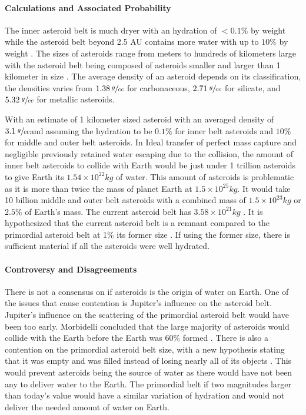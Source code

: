 \paragraph{Calculations and Associated Probability}
The inner asteroid belt is much dryer with an hydration of \(<0.1\%\) by weight while the  asteroid belt beyond 2.5 AU contains more water with up to \(10\%\) by weight \cite{morbidelli2000source}. The sizes of asteroids range from meters to hundreds of kilometers large with the asteroid belt being composed of asteroids smaller and larger than 1 kilometer in size \cite{asteroid_AvgSz}. The average density of an asteroid depends on its classification, the densities varies from \(1.38 \: \sfrac{g}{cc}\) for carbonaceous, \(2.71 \: \sfrac{g}{cc}\) for silicate, and \(5.32 \: \sfrac{g}{cc}\) for metallic asteroids\cite{Asteroid_Density}. 

With an estimate of 1 kilometer sized asteroid with an averaged density of \(3.1 \: \sfrac{g}{cc}\)and assuming the hydration to be \(0.1\%\) for inner belt asteroids and \(10\%\) for middle and outer belt asteroids.
In Ideal transfer of perfect mass capture and negligible previously retained water escaping due to the collision, the amount of inner belt asteroids to collide with Earth would be just under 1 trillion asteroids to give Earth its \(1.54\times 10^{22} kg\) of water. This amount of asteroids is problematic as it is more than twice the mass of planet Earth at \(1.5\times 10^{25} kg\).
It would take 10 billion middle and outer belt asteroids with a combined mass of \(1.5\times 10^{23} kg\) or \(2.5\%\) of Earth's mass.
The current asteroid belt has \(3.58 \times 10^{21}kg\) \cite{AsteroidBeltMass}.
It is hypothesized that the current asteroid belt is a remnant compared to the primordial asteroid belt at 1\% its former size \cite{PrimAstBelt}. If using the former size, there is sufficient material if all the asteroids were well hydrated.

\paragraph{Controversy and Disagreements}
There is not a consensus on if asteroids is the origin of water on Earth. One of the issues that cause contention is Jupiter's influence on the asteroid belt. Jupiter's influence on the scattering of the primordial asteroid belt would have been too early. Morbidelli concluded that the large majority of asteroids would collide with the Earth before the Earth was 60\% formed \cite{morbidelli2000source}. 
There is also a contention on the primordial asteroid belt size, with a new hypothesis stating that it was empty and was filled instead of losing nearly all of its objects \cite{Emptybelt}. This would prevent asteroids being the source of water as there would have not been any to deliver water to the Earth.
The primordial belt if two magnitudes larger than today's value would have a similar variation of hydration and would not deliver the needed amount of water on Earth.

